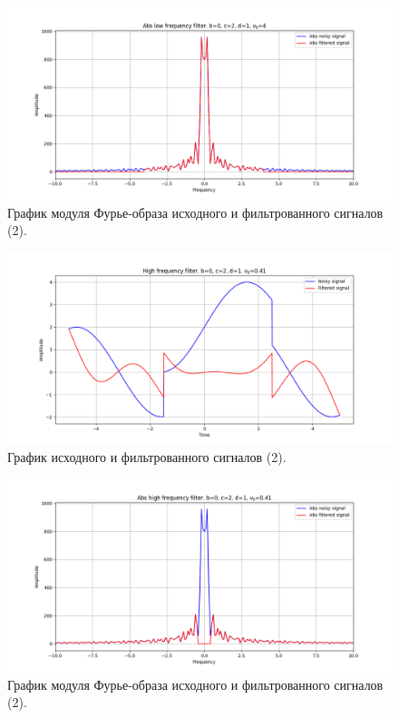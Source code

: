 \documentclass[a4paper, 12pt]{article}
\begin{document}
    \begin{figure}[!htb]
        \centering
        \includegraphics[scale=0.48]{2_1_abs_u_U_nospec.png}
        \captionsetup{skip=0pt}
        \caption{График модуля Фурье-образа исходного и фильтрованного сигналов (2).}
        \label{fig:fig84}
    \end{figure}
    \begin{figure}[!htb]
        \centering
        \includegraphics[scale=0.48]{2_2_u_flt_u_nospec.png}
        \captionsetup{skip=0pt}
        \caption{График исходного и фильтрованного сигналов (2).}
        \label{fig:fig85}
    \end{figure}
    \begin{figure}[!htb]
        \centering
        \includegraphics[scale=0.48]{2_2_abs_u_U_nospec.png}
        \captionsetup{skip=0pt}
        \caption{График модуля Фурье-образа исходного и фильтрованного сигналов (2).}
        \label{fig:fig86}
    \end{figure}
\end{document}
